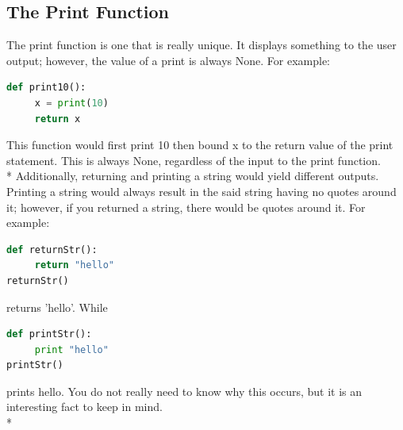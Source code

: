 \documentclass{article}
\begin{document}
\subsection{The Print Function}
The print function is one that is really unique. It displays something to the user output; however, the value of a print is always None. For example: 
\begin{lstlisting}[language = Python]
def print10():
     x = print(10)
     return x
\end{lstlisting}
This function would first print 10 then bound x to the return value of the print statement. This is always None, regardless of the input to the print function.
\\* 
\bigskip
Additionally, returning and printing a string would yield different outputs. Printing a string would always result in the said string having no quotes around it; however, if you returned a string, there would be quotes around it. For example: 
\begin{lstlisting}[language = Python]
def returnStr():
     return "hello"
returnStr()
\end{lstlisting}
returns 'hello'. While 
\begin{lstlisting}[language = Python]
def printStr():
     print "hello"
printStr()
\end{lstlisting}
prints hello. You do not really need to know why this occurs, but it is an interesting fact to keep in mind. \\*
\end{document}
